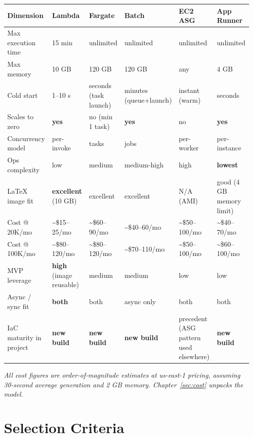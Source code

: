 \documentclass[11pt,letterpaper]{article}
\begin{document}
{\footnotesize
\begin{longtable}{@{}p{2.4cm}p{1.7cm}p{1.7cm}p{1.7cm}p{1.7cm}p{1.7cm}@{}}
\toprule
\textbf{Dimension} & \textbf{Lambda} & \textbf{Fargate} & \textbf{Batch} & \textbf{EC2 ASG} & \textbf{App Runner} \\
\midrule
\endhead

Max execution time & 15 min & unlimited & unlimited & unlimited & unlimited \\
Max memory & 10 GB & 120 GB & 120 GB & any & 4 GB \\
Cold start & 1--10 s & seconds (task launch) & minutes (queue+launch) & instant (warm) & seconds \\
Scales to zero & \textbf{yes} & no (min 1 task) & \textbf{yes} & no & \textbf{yes} \\
Concurrency model & per-invoke & tasks & jobs & per-worker & per-instance \\
Ops complexity & low & medium & medium-high & high & \textbf{lowest} \\
LaTeX image fit & \textbf{excellent} (10 GB) & excellent & excellent & N/A (AMI) & good (4 GB memory limit) \\
Cost @ 20K/mo & \textasciitilde\$15--25/mo & \textasciitilde\$60--90/mo & \textasciitilde\$40--60/mo & \textasciitilde\$50--100/mo & \textasciitilde\$40--70/mo \\
Cost @ 100K/mo & \textasciitilde\$80--120/mo & \textasciitilde\$80--120/mo & \textasciitilde\$70--110/mo & \textasciitilde\$50--100/mo & \textasciitilde\$60--100/mo \\
MVP leverage & \textbf{high} (image reusable) & medium & medium & low & low \\
Async / sync fit & \textbf{both} & both & async only & both & both \\
IaC maturity in project & \textbf{new build} & \textbf{new build} & \textbf{new build} & precedent (ASG pattern used elsewhere) & \textbf{new build} \\
\bottomrule
\end{longtable}
}

\emph{All cost figures are order-of-magnitude estimates at us-east-1 pricing, assuming 30-second average generation and 2 GB memory. Chapter~\ref{sec:cost} unpacks the model.}

\newpage

\section{Selection Criteria}
\label{sec:selection}
\end{document}

